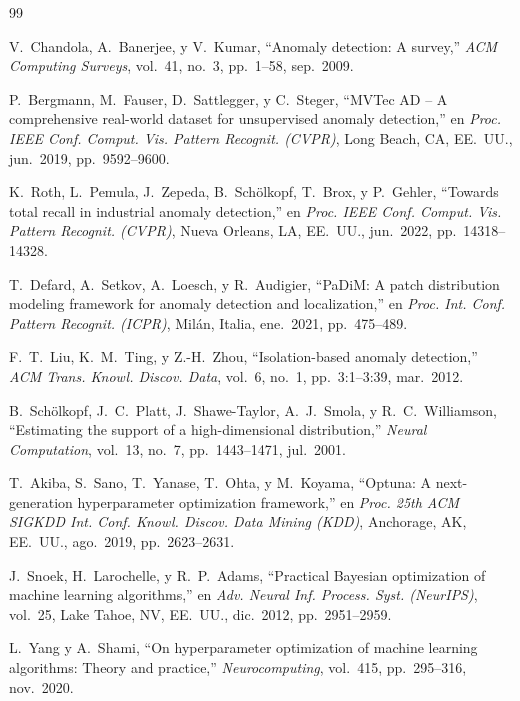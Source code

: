 \documentclass[conference,spanish]{IEEEtran}
\begin{document}

\begin{thebibliography}{99}

V.~Chandola, A.~Banerjee, y V.~Kumar,
``Anomaly detection: A survey,''
\emph{ACM Computing Surveys}, vol.~41, no.~3, pp.~1--58, sep.~2009.

P.~Bergmann, M.~Fauser, D.~Sattlegger, y C.~Steger,
``MVTec AD -- A comprehensive real-world dataset for unsupervised anomaly
  detection,''
en \emph{Proc. IEEE Conf. Comput. Vis. Pattern Recognit. (CVPR)},
Long Beach, CA, EE.~UU., jun.~2019, pp.~9592--9600.

K.~Roth, L.~Pemula, J.~Zepeda, B.~Schölkopf, T.~Brox, y P.~Gehler,
``Towards total recall in industrial anomaly detection,''
en \emph{Proc. IEEE Conf. Comput. Vis. Pattern Recognit. (CVPR)},
Nueva Orleans, LA, EE.~UU., jun.~2022, pp.~14318--14328.

T.~Defard, A.~Setkov, A.~Loesch, y R.~Audigier,
``PaDiM: A patch distribution modeling framework for anomaly detection and
  localization,''
en \emph{Proc. Int. Conf. Pattern Recognit. (ICPR)},
Milán, Italia, ene.~2021, pp.~475--489.

F.~T.~Liu, K.~M.~Ting, y Z.-H.~Zhou,
``Isolation-based anomaly detection,''
\emph{ACM Trans. Knowl. Discov. Data}, vol.~6, no.~1, pp.~3:1--3:39, mar.~2012.

B.~Schölkopf, J.~C.~Platt, J.~Shawe-Taylor, A.~J.~Smola,
y R.~C.~Williamson,
``Estimating the support of a high-dimensional distribution,''
\emph{Neural Computation}, vol.~13, no.~7, pp.~1443--1471, jul.~2001.

T.~Akiba, S.~Sano, T.~Yanase, T.~Ohta, y M.~Koyama,
``Optuna: A next-generation hyperparameter optimization framework,''
en \emph{Proc. 25th ACM SIGKDD Int. Conf. Knowl. Discov. Data Mining
  (KDD)}, Anchorage, AK, EE.~UU., ago.~2019, pp.~2623--2631.

J.~Snoek, H.~Larochelle, y R.~P.~Adams,
``Practical Bayesian optimization of machine learning algorithms,''
en \emph{Adv. Neural Inf. Process. Syst. (NeurIPS)}, vol.~25,
Lake Tahoe, NV, EE.~UU., dic.~2012, pp.~2951--2959.

L.~Yang y A.~Shami,
``On hyperparameter optimization of machine learning algorithms: Theory and
  practice,''
\emph{Neurocomputing}, vol.~415, pp.~295--316, nov.~2020.


\end{thebibliography}
\end{document}
